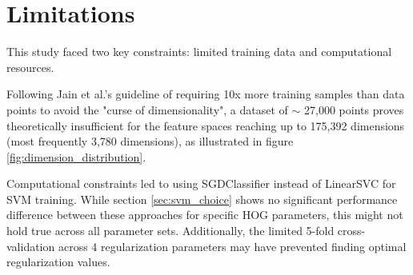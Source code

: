\section{Limitations}

This study faced two key constraints: limited training data and computational resources. 

Following Jain et al.'s guideline \cite{jain_2000_statistical} of requiring 10x more training samples than data points to avoid the "curse of dimensionality", a dataset of $\sim$ 27,000 points proves theoretically insufficient for the feature spaces reaching up to 175,392 dimensions (most frequently 3,780 dimensions), as illustrated in figure \ref{fig:dimension_distribution}.

Computational constraints led to using SGDClassifier instead of LinearSVC for SVM training. While section \ref{sec:svm_choice} shows no significant performance difference between these approaches for specific HOG parameters, this might not hold true across all parameter sets. Additionally, the limited 5-fold cross-validation across 4 regularization parameters may have prevented finding optimal regularization values.
